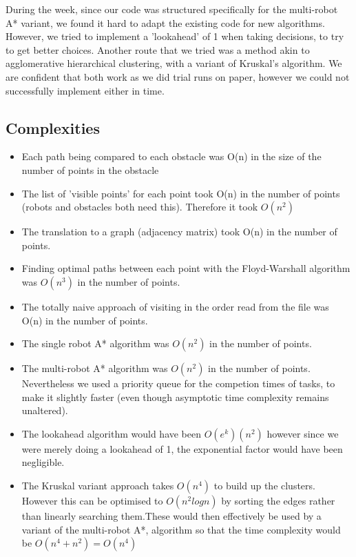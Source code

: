 \documentclass[12pt]{article}
\begin{document}
During the week, since our code was structured specifically for the multi-robot A* variant, we found it hard to adapt the existing code for new algorithms. However, we tried to implement a 'lookahead' of 1 when taking decisions, to try to get better choices. Another route that we tried was a method akin to agglomerative hierarchical clustering, with a variant of Kruskal's algorithm. We are confident that both work as we did trial runs on paper, however we could not successfully implement either in time.
\par

\subsection{Complexities}
\begin{itemize}
\item Each path being compared to each obstacle was O(n) in the size of the number of points in the obstacle
\item The list of 'visible points' for each point took O(n) in the number of points (robots and obstacles both need this). Therefore it took $O(n^2) $
\item The translation to a graph (adjacency matrix) took O(n) in the number of points.
\item Finding optimal paths between each point with the Floyd-Warshall algorithm was $O(n^3)$ in the number of points.
\item The totally naive approach of visiting in the order read from the file was O(n) in the number of points.
\item The single robot A* algorithm was $O(n^2)$ in the number of points.
\item The multi-robot A* algorithm was $O(n^2)$ in the number of points. Nevertheless we used a priority queue for the competion times of tasks, to make it slightly faster (even though asymptotic time complexity remains unaltered).
\item The lookahead algorithm would have been $O(e^k)(n^2)$ however since we were merely doing a lookahead of 1, the exponential factor would have been negligible.
\item The Kruskal variant approach takes $O(n^4)$ to build up the clusters. However this can be optimised to $O(n^2 logn)$ by sorting the edges rather than linearly searching them.These would then effectively be used by a variant of the multi-robot A*, algorithm so that the time complexity would be $O(n^4 + n^2) = O(n^4)$
\end{itemize}
\end{document}
